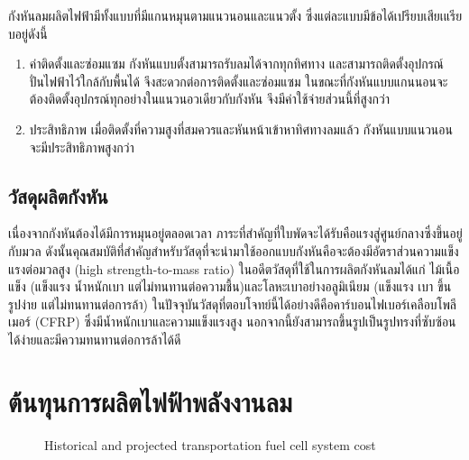 \message{ !name(solar.tex)}\documentclass[
a4paper,
svgnames,
openany,
justified,
]{tufte-book}
\begin{document}
กังหันลมผลิตไฟฟ้ามีทั้งแบบที่มีแกนหมุนตามแนวนอนและแนวตั้ง ซึ่งแต่ละแบบมีข้อได้เปรียบเสียเแรียบอยู่ดังนี้

\begin{enumerate}
\item ค่าติดตั้งและซ่อมแซม กังหันแบบตั้งสามารถรับลมได้จากทุกทิศทาง และสามารถติดตั้งอุปกรณ์ปั่นไฟฟ้าไว้ใกล้กับพื้นได้ จึงสะดวกต่อการติดตั้งและซ่อมแซม ในขณะที่กังหันแบบแกนนอนจะต้องติดตั้งอุปกรณ์ทุกอย่างในแนวนอวเดียวกับกังหัน จึงมีค่าใช้จ่ายส่วนนี้ที่สูงกว่า
\item ประสิทธิภาพ เมื่อติดตั้งที่ความสูงที่สมควรและหันหน้าเข้าหาทิศทางลมแล้ว กังหันแบบแนวนอนจะมีประสิทธิภาพสูงกว่า
\end{enumerate}

\subsection{วัสดุผลิตกังหัน}

เนื่องจากกังหันต้องได้มีการหมุนอยู่ตลอดเวลา ภาระที่สำคัญที่ใบพัดจะได้รับคือแรงสู่ศูนย์กลางซึ่งขึ้นอยู่กับมวล ดังนั้นคุณสมบัติที่สำคัญสำหรับวัสดุที่จะนำมาใช้ออกแบบกังหันคือจะต้องมีอัตราส่วนความแข็งแรงต่อมวลสูง (high strength-to-mass ratio) ในอดีตวัสดุที่ใช้ในการผลิตกังหันลมได้แก่ ไม้เนื้อแข็ง (แข็งแรง น้ำหนักเบา แต่ไม่ทนทานต่อความชื้น)และโลหะเบาอย่างอลูมิเนียม (แข็งแรง เบา ขึ้นรูปง่าย แต่ไม่ทนทานต่อการล้า) ในปัจจุบันวัสดุที่ตอบโจทย์นี้ได้อย่างดีคือคาร์บอนไฟเบอร์เคลือบโพลีเมอร์ (CFRP) ซึ่งมีน้ำหนักเบาและความแข็งแรงสูง นอกจากนี้ยังสามารถขึ้นรูปเป็นรูปทรงที่ซับซ้อนได้ง่ายและมีความทนทานต่อการล้าได้ดี

\section{ต้นทุนการผลิตไฟฟ้าพลังงานลม}

\begin{figure}[h]
  \centering
  \caption{Historical and projected transportation fuel cell system cost}
  \label{fig:projected fc cost}
\end{figure}
\end{document}

